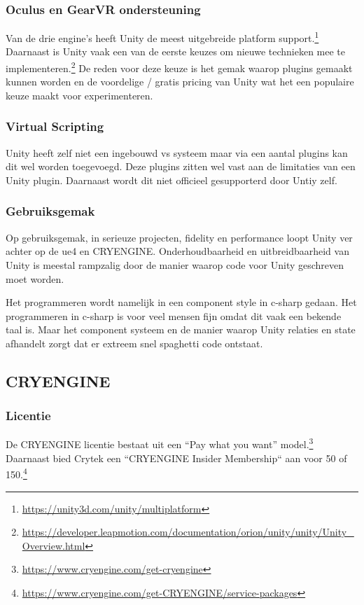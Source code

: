 \subsubsection{Oculus en GearVR ondersteuning}
Van de drie engine’s heeft Unity de meest uitgebreide platform support.\footnote{\url{https://unity3d.com/unity/multiplatform}} Daarnaast is Unity vaak een van de eerste keuzes om nieuwe technieken mee te implementeren.\footnote{\url{https://developer.leapmotion.com/documentation/orion/unity/unity/Unity_Overview.html}} De reden voor deze keuze is het gemak waarop plugins gemaakt kunnen worden en de voordelige / gratis pricing van Unity wat het een populaire keuze maakt voor experimenteren.

\subsubsection{Virtual Scripting}
Unity heeft zelf niet een ingebouwd \gls{vs} systeem maar via een aantal plugins kan dit wel worden toegevoegd. Deze plugins zitten wel vast aan de limitaties van een Unity plugin. Daarnaast wordt dit niet officieel gesupporterd door Untiy zelf.

\subsubsection{Gebruiksgemak}
Op gebruiksgemak, in serieuze projecten, fidelity en performance loopt Unity ver achter op de \gls{ue4} en CRYENGINE. Onderhoudbaarheid en uitbreidbaarheid van Unity is meestal rampzalig door de manier waarop code voor Unity geschreven moet worden. 

Het programmeren wordt namelijk in een component style in c-sharp gedaan. Het programmeren in c-sharp is voor veel mensen fijn omdat dit vaak een bekende taal is. Maar het component systeem en de manier waarop Unity relaties en state afhandelt zorgt dat er extreem snel spaghetti code ontstaat. 

\subsection{CRYENGINE}
\subsubsection{Licentie}
De CRYENGINE licentie bestaat uit een “Pay what you want” model.\footnote{\url{https://www.cryengine.com/get-cryengine}} Daarnaast bied Crytek een “CRYENGINE Insider Membership“ aan voor 50 of 150.\footnote{\url{https://www.cryengine.com/get-CRYENGINE/service-packages}} 

